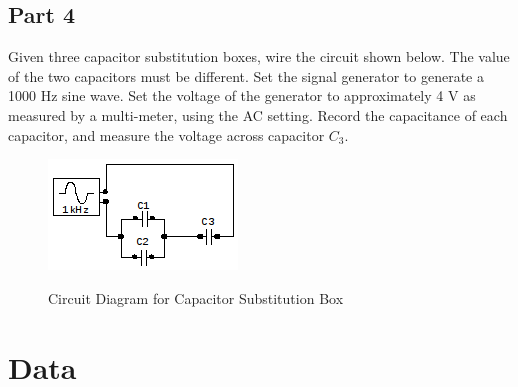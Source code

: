 \documentclass[twocolumn,english]{IEEEtran}
\theoremstyle{plain}
\theoremstyle{plain}
\begin{document}
\subsection*{Part 4}
Given three capacitor substitution boxes, wire the circuit shown below. The value of the two capacitors must be different. Set the signal generator to generate a 1000 Hz sine wave. Set the voltage of the generator to approximately 4 V as measured by a multi-meter, using the AC setting. Record the capacitance of each capacitor, and measure the voltage across capacitor $C_3$.

\begin{figure}[h!]
\begin{centering}
  \begin{center}
\includegraphics[keepaspectratio=true]{./diagram1.png}
\label{fig:circuit_diagram1}
\caption{Circuit Diagram for Capacitor Substitution Box}
\end{center}
\par\end{centering}
\end{figure}



\section{Data}
\end{document}
